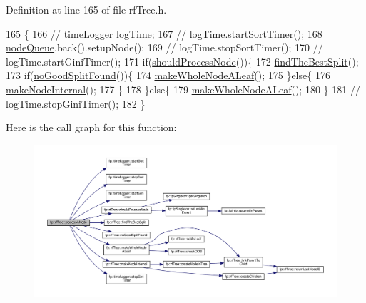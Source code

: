 Definition at line 165 of file rf\+Tree.\+h.


\begin{DoxyCode}
165                                           \{
166                 \textcolor{comment}{//  timeLogger logTime;}
167                 \textcolor{comment}{//  logTime.startSortTimer();}
168                     \hyperlink{classfp_1_1rfTree_af72d0a2f930fd480dfb4858885c2df23}{nodeQueue}.back().setupNode();
169                 \textcolor{comment}{//  logTime.stopSortTimer();}
170                 \textcolor{comment}{//  logTime.startGiniTimer();}
171                     \textcolor{keywordflow}{if}(\hyperlink{classfp_1_1rfTree_a36abf82d31ca57670b09da16525dce0d}{shouldProcessNode}())\{
172                         \hyperlink{classfp_1_1rfTree_a51da8e4a46582b26643a4ae392230e77}{findTheBestSplit}();
173                         \textcolor{keywordflow}{if}(\hyperlink{classfp_1_1rfTree_a618bdc2d22267b4bb4f5e1881b1788f6}{noGoodSplitFound}())\{
174                             \hyperlink{classfp_1_1rfTree_a2b2a47186c0784415609f1c9b005e702}{makeWholeNodeALeaf}();
175                         \}\textcolor{keywordflow}{else}\{
176                             \hyperlink{classfp_1_1rfTree_aaf7bbdde5f7313c3e84853bbf5fdf792}{makeNodeInternal}();
177                         \}
178                     \}\textcolor{keywordflow}{else}\{
179                         \hyperlink{classfp_1_1rfTree_a2b2a47186c0784415609f1c9b005e702}{makeWholeNodeALeaf}();
180                     \}
181                 \textcolor{comment}{//  logTime.stopGiniTimer();}
182                 \}
\end{DoxyCode}
Here is the call graph for this function\+:
\nopagebreak
\begin{figure}[H]
\begin{center}
\leavevmode
\includegraphics[width=350pt]{classfp_1_1rfTree_ab7760333f6857ab7ce2ee29a7bc16e65_cgraph}
\end{center}
\end{figure}
\mbox{\label{classfp_1_1rfTree_ab7760333f6857ab7ce2ee29a7bc16e65}} 
